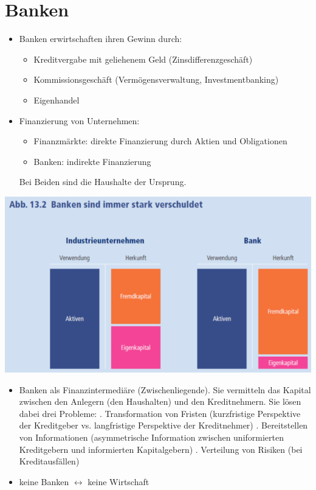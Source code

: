 \section{Banken}
\begin{minipage}{0.5\linewidth}
	\begin{itemize}
		\item Banken erwirtschaften ihren Gewinn durch:
		\begin{itemize}
			\item Kreditvergabe mit geliehenem Geld (Zinsdifferenzgeschäft)
			\item Kommissionsgeschäft (Vermögensverwaltung, Investmentbanking)
			\item Eigenhandel
		\end{itemize}
		\item Finanzierung von Unternehmen:
		\begin{itemize}
			\item Finanzmärkte: direkte Finanzierung durch Aktien und Obligationen
			\item Banken: indirekte Finanzierung
		\end{itemize}
		Bei Beiden sind die Haushalte der Ursprung.
	\end{itemize}
\end{minipage}
\hspace{0.05\linewidth}
\begin{minipage}{0.4\linewidth}
	\includegraphics[width=\linewidth]{images/banken.png}
\end{minipage}
\begin{itemize}
	\item Banken als Finanzintermediäre (Zwischenliegende).
	Sie vermitteln das Kapital zwischen den Anlegern (den Haushalten) und den Kreditnehmern. Sie lösen dabei drei Probleme:
	. Transformation von Fristen (kurzfristige Perspektive der Kreditgeber vs. langfristige Perspektive der Kreditnehmer)
	. Bereitstellen von Informationen (asymmetrische Information zwischen uniformierten Kreditgebern und informierten Kapitalgebern)
	. Verteilung von Risiken (bei Kreditausfällen)
	\item keine Banken $\leftrightarrow$ keine Wirtschaft
\end{itemize}

